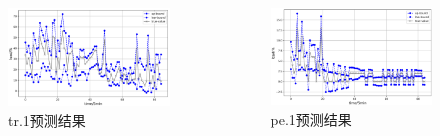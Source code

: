 \begin{frame}
\begin{columns}[T,onlytextwidth]
\begin{column}{0.3\textwidth}
    \begin{minipage}{\textwidth}
        \begin{figure}
        \centering
        \includegraphics[width=\textwidth]{figures/fig11_b_tr_predict.png}
        \caption{tr.1预测结果}
        \label{fig:fig11_b}
        \end{figure}
    \end{minipage}
\end{column}
\begin{column}{0.3\textwidth}
    \begin{minipage}{\textwidth}
        \begin{figure}
        \centering
        \includegraphics[width=\textwidth]{figures/fig11_c_pe_predict.png}
        \caption{pe.1预测结果}
        \label{fig:fig11_c}
        \end{figure}
    \end{minipage}
\end{column}
\end{columns}
\end{frame}


